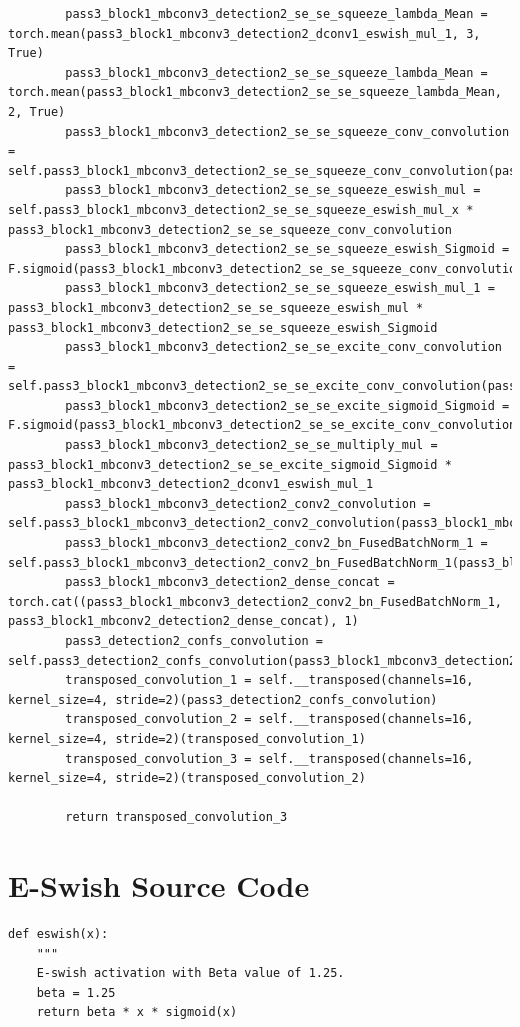 \documentclass{fisatprojectfinal}
\begin{document}
\begin{appendices}
\begin{lstlisting}
        pass3_block1_mbconv3_detection2_se_se_squeeze_lambda_Mean = torch.mean(pass3_block1_mbconv3_detection2_dconv1_eswish_mul_1, 3, True)
        pass3_block1_mbconv3_detection2_se_se_squeeze_lambda_Mean = torch.mean(pass3_block1_mbconv3_detection2_se_se_squeeze_lambda_Mean, 2, True)
        pass3_block1_mbconv3_detection2_se_se_squeeze_conv_convolution = self.pass3_block1_mbconv3_detection2_se_se_squeeze_conv_convolution(pass3_block1_mbconv3_detection2_se_se_squeeze_lambda_Mean)
        pass3_block1_mbconv3_detection2_se_se_squeeze_eswish_mul = self.pass3_block1_mbconv3_detection2_se_se_squeeze_eswish_mul_x * pass3_block1_mbconv3_detection2_se_se_squeeze_conv_convolution
        pass3_block1_mbconv3_detection2_se_se_squeeze_eswish_Sigmoid = F.sigmoid(pass3_block1_mbconv3_detection2_se_se_squeeze_conv_convolution)
        pass3_block1_mbconv3_detection2_se_se_squeeze_eswish_mul_1 = pass3_block1_mbconv3_detection2_se_se_squeeze_eswish_mul * pass3_block1_mbconv3_detection2_se_se_squeeze_eswish_Sigmoid
        pass3_block1_mbconv3_detection2_se_se_excite_conv_convolution = self.pass3_block1_mbconv3_detection2_se_se_excite_conv_convolution(pass3_block1_mbconv3_detection2_se_se_squeeze_eswish_mul_1)
        pass3_block1_mbconv3_detection2_se_se_excite_sigmoid_Sigmoid = F.sigmoid(pass3_block1_mbconv3_detection2_se_se_excite_conv_convolution)
        pass3_block1_mbconv3_detection2_se_se_multiply_mul = pass3_block1_mbconv3_detection2_se_se_excite_sigmoid_Sigmoid * pass3_block1_mbconv3_detection2_dconv1_eswish_mul_1
        pass3_block1_mbconv3_detection2_conv2_convolution = self.pass3_block1_mbconv3_detection2_conv2_convolution(pass3_block1_mbconv3_detection2_se_se_multiply_mul)
        pass3_block1_mbconv3_detection2_conv2_bn_FusedBatchNorm_1 = self.pass3_block1_mbconv3_detection2_conv2_bn_FusedBatchNorm_1(pass3_block1_mbconv3_detection2_conv2_convolution)
        pass3_block1_mbconv3_detection2_dense_concat = torch.cat((pass3_block1_mbconv3_detection2_conv2_bn_FusedBatchNorm_1, pass3_block1_mbconv2_detection2_dense_concat), 1)
        pass3_detection2_confs_convolution = self.pass3_detection2_confs_convolution(pass3_block1_mbconv3_detection2_dense_concat)
        transposed_convolution_1 = self.__transposed(channels=16, kernel_size=4, stride=2)(pass3_detection2_confs_convolution)
        transposed_convolution_2 = self.__transposed(channels=16, kernel_size=4, stride=2)(transposed_convolution_1)
        transposed_convolution_3 = self.__transposed(channels=16, kernel_size=4, stride=2)(transposed_convolution_2)
        
        return transposed_convolution_3
    \end{lstlisting}
	\section{E-Swish Source Code}
	\begin{lstlisting}
def eswish(x):
    """
    E-swish activation with Beta value of 1.25.
    beta = 1.25
    return beta * x * sigmoid(x)
	\end{lstlisting}
	
\end{appendices}
\end{document}
